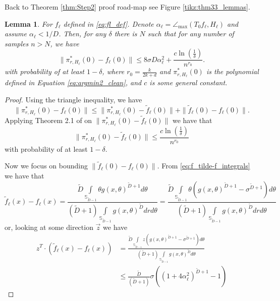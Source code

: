 \documentclass[12pt]{article}
\newtheorem{Lemma}[Theorem]{Lemma}
\theoremstyle{remark}
\newcommand{\wtilde}[1]{\widetilde{#1}}
\newcommand{\maxangle}{\angle_{\max}}
\begin{document}
\begin{appendices}
Back to Theorem \ref{thm:Step2} proof road-map see Figure \ref{tikz:thm33_lemmas}.




\begin{Lemma}\label{lem:dist_to_f_l0_srtong_small_alpha}
For $f_\ell$ defined in \eqref{eq:fl_def}. Denote 
$\alpha_\ell = \maxangle (T_0f_{\ell}, H_{\ell})$ and assume $\alpha_\ell<1/D$. Then,
for any $\delta$ there is $N$ such that for any number of samples $n > N$, we have 
\[
\| \pi^*_{r, H_\ell}(0) - f_\ell(0)\| \leq 8 \sigma D \alpha_\ell ^2 + \frac{c \ln\left(\frac{1}{\delta}\right)}{n^{r_0}}.
\]
with probability of at least $1-\delta$, where $r_0 = \frac{k}{2k+d}$ and $\pi^*_{r, H_\ell}(0)$ is the polynomial defined in Equation \eqref{eq:argmin2_clean}, and $c$ is some general constant.
\end{Lemma}
\begin{proof}
Using the triangle inequality, we have 
\begin{equation}\label{eq:f_ell0_triangle_l2}
    \|\pi^*_{r, H_\ell}(0) - f_\ell(0)\| \leq \| \pi^*_{r, H_\ell}(0)  - \wtilde{f}_\ell(0) \| + \| \wtilde{f}_\ell(0)  - f_\ell(0)\|.
\end{equation}
Applying Theorem 2.1 of \cite{aizenbud2021VectorEstimation} on $\| \pi^*_{r, H_\ell}(0)  - \wtilde{f}_\ell(0) \|$ we have that
\begin{equation}\label{eq:f_tilde0_bound_stone_l2}
        \| \pi^*_{r, H_\ell}(0) - \wtilde{f}_\ell(0)\| \leq \frac{c\ln\left(\frac{1}{\delta}\right)}{n^{r_0}}
\end{equation}
with probability of at least $1-\delta$.

Now we focus on bounding $\| \wtilde{f}_\ell(0)  - f_\ell(0)\|$. 
From \eqref{eq:f_tilde-f_integrals} we have that 
\begin{equation*}
\wtilde{f}_\ell(x) - f_\ell(x)=
\frac{\wtilde D\int\limits_{\mathbb{S}_{\wtilde D-1}}\theta g(x,\theta)^{\wtilde D+1} d\theta}{(\wtilde D+1)\int\limits_{\mathbb{S}_{\wtilde D-1}}g(x,\theta)^{\wtilde D} drd\theta}     
=
\frac{\wtilde D\int\limits_{\mathbb{S}_{\wtilde D-1}}\theta (g(x,\theta)^{\wtilde D+1} - \sigma^{\wtilde D+1}) d\theta}{(\wtilde D+1)\int\limits_{\mathbb{S}_{\wtilde D-1}}g(x,\theta)^{\wtilde D} drd\theta}     
\end{equation*}
or, looking at some direction $\vec{z}$ we have 
\begin{align*}
z^T\cdot (\wtilde{f}_\ell(x) - f_\ell(x))&=
\frac{\wtilde D\int\limits_{\mathbb{S}_{\wtilde D-1}}z (g(x,\theta)^{\wtilde D+1}- \sigma^{\wtilde D+1}) d\theta}{(\wtilde D+1)\int\limits_{\mathbb{S}_{\wtilde D-1}}g(x,\theta)^{\wtilde D} d\theta} 
\\
&\leq
\frac{\wtilde D}{(\wtilde D+1)}\sigma((1+4\alpha_\ell^2)^{\wtilde D+1} - 1)
\end{align*}


\end{proof}
\end{appendices}
\end{document}
